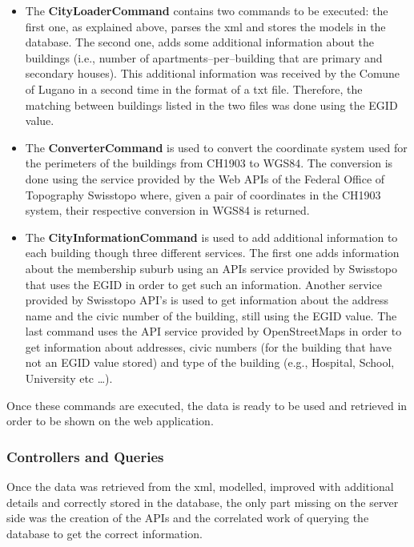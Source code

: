 \begin{itemize}
	\item The {\bf CityLoaderCommand} contains two commands to be executed: the first one, as explained above, parses the xml and stores the models in the database. The second one, adds some additional information about the buildings (i.e., number of apartments--per--building that are primary and secondary houses). This additional information was received by the Comune of Lugano in a second time in the format of a txt file. Therefore, the matching between buildings listed in the two files was done using the EGID value. 
	\item The {\bf ConverterCommand} is used to convert the coordinate system used for the perimeters of the buildings from CH1903 to WGS84. The conversion is done using the service provided by the Web APIs of the Federal Office of Topography Swisstopo  where, given a pair of coordinates in the CH1903 system, their respective conversion in WGS84 is returned.
	\item The {\bf CityInformationCommand} is used to add additional information to each building though three different services. The first one adds information about the membership suburb using an APIs service provided by Swisstopo that uses the EGID in order to get such an information. Another service provided by Swisstopo API's is used to get information about the address name and the civic number of the building, still using the EGID value. The last command uses the API service provided by OpenStreetMaps in order to get information about addresses, civic numbers (for the building that have not an EGID value stored) and type of the building (e.g., Hospital, School, University etc \dots).  
\end{itemize}
Once these commands are executed, the data is ready to be used and retrieved in order to be shown on the web application.
\subsubsection{Controllers and Queries}
Once the data was retrieved from the xml, modelled, improved with additional details and correctly stored in the database, the only part missing on the server side was the creation of the APIs and the correlated work of querying the database to get the correct information.\\
\begin{center}
\end{center}

